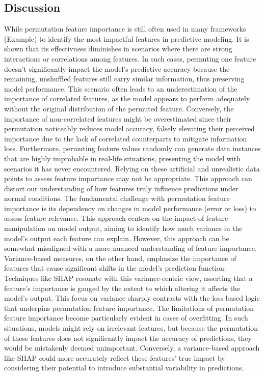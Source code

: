 \documentclass[12pt]{article}
\begin{document}
\subsection{Discussion}
While permutation feature importance is still often used in many frameworks (Example) to identify the most impactful features in predictive modeling. It is shown that its effectivness diminishes 
in scenarios where there are strong interactions or correlations among features. 
In such cases, permuting one feature doesn't significantly impact the model's predictive accuracy because the remaining, unshuffled features still carry similar information, thus preserving model performance. 
This scenario often leads to an underestimation of the importance of correlated features, as the model appears to perform adequately without the original distribution of the permuted feature. 
Conversely, the importance of non-correlated features might be overestimated since their permutation noticeably reduces model accuracy, falsely elevating their perceived importance due to the lack of correlated counterparts to mitigate information loss.
 Furthermore, permuting feature values randomly can generate data instances that are highly improbable in real-life situations, presenting the model with scenarios it has never encountered. Relying on these artificial and unrealistic data points to assess feature importance may not be appropriate. This approach can distort our understanding of how features truly influence predictions under normal conditions.
The fundamental challenge with permutation feature importance is its dependency on changes in model performance (error or loss) to assess feature relevance. 
 This approach centers on the impact of feature manipulation on model output, aiming to identify how much variance in the model's output each feature can explain.  
However, this approach can be somewhat misaligned with a more nuanced understanding of feature importance.
Variance-based measures, on the other hand, emphasize the importance of features that cause significant shifts in the model's prediction function.
 Techniques like SHAP resonate with this variance-centric view, asserting that a feature's importance is gauged by the extent to which altering it affects the model's output.
 This focus on variance sharply contrasts with the loss-based logic that underpins permutation feature importance.
 The limitations of permutation feature importance become particularly evident in cases of overfitting. In such situations, models might rely on irrelevant features, but because the permutation of these features does not significantly impact the accuracy of predictions, they would be mistakenly deemed unimportant. 
  Conversely, a variance-based approach like SHAP could more accurately reflect these features' true impact by considering their potential to introduce substantial variability in predictions.
 
\end{document}
